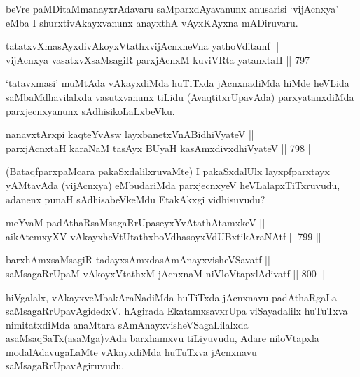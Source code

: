 \begin{artha}
beVre paMDitaMmanayxrAdavaru saMparxdAyavanunx anusarisi `vijAcnxya' eMba I shurxtivAkayxvanunx anayxthA vAyxKAyxna mADiruvaru.
\end{artha}


\begin{shl}
tatatxvXmasAyxdivAkoyxVtathxvijAcnxneVna yathoVditamf || \\
vijAcnxya vasatxvXsaMsagiR parxjAcnxM kuviVRta yatanxtaH \hfill || 797 ||  
\end{shl}

\begin{artha}
`tatavxmasi' muMtAda vAkayxdiMda huTiTxda jAcnxnadiMda hiMde heVLida saMbaMdhavilalxda vasutxvanunx tiLidu (AvaqtitxrUpavAda) parxyatanxdiMda parxjecnxyanunx sAdhisikoLaLxbeVku.
\end{artha}


\begin{shl}
nanavxtArxpi kaqteYvAsw layxbanetxVnABidhiVyateV || \\
parxjAcnx\s taH karaNaM tasAyx BUyaH kasAmxdivxdhiVyateV \hfill || 798 ||  
\end{shl}

\begin{artha}
(BataqfparxpaMcara pakaSxdalilxruvaMte) I pakaSxdalUlx layxpfparxtayx yAMtavAda (vijAcnxya) eMbudariMda parxjecnxyeV heVLalapxTiTxruvudu, adanenx punaH sAdhisabeVkeMdu EtakAkxgi vidhisuvudu?
\end{artha}

\begin{shl}
meYvaM padAthaRsaMsagaRrUpaseyxYvAtathAtamxkeV || \\
aikAtemxyXV vAkayxheVtUtathxboVdhasoyxVdUBxtikAraNAtf \hfill || 799 ||  
\end{shl}
				
\begin{shl}
barxhAmxsaMsagiR tadayxsAmxdasAmAnayxvisheVSavatf || \\
saMsagaRrUpaM vAkoyxVtathxM jAcnxnaM niVloVtapxlAdivatf \hfill || 800 ||  
\end{shl}

\begin{artha}
hiVgalalx, vAkayxveMbakAraNadiMda huTiTxda jAcnxnavu padAthaRgaLa saMsagaRrUpavAgidedxV. hAgirada EkatamxsavxrUpa viSayadalilx huTuTxva nimitatxdiMda anaMtara sAmAnayxvisheVSagaLilalxda asaMsaqSaTx(asaMga)vAda barxhamxvu tiLiyuvudu, Adare niloVtapxla modalAdavugaLaMte vAkayxdiMda huTuTxva jAcnxnavu saMsagaRrUpavAgiruvudu.
\end{artha}

